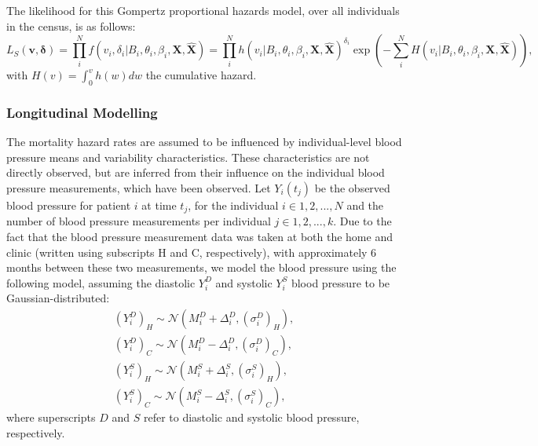 \documentclass[
]{article}
\begin{document}
The likelihood for this Gompertz proportional hazards model, over all individuals in the census, is as follows:
\begin{equation}\label{likesurv}
L_S(\boldsymbol{v},\boldsymbol{\delta})=\prod_i^N f(v_i,\delta_i|B_i,\theta_i,\beta_i,\boldsymbol{X},\hat{\boldsymbol{X}})=\prod_i^N h(v_i|B_i,\theta_i,\beta_i,\boldsymbol{X},\hat{\boldsymbol{X}})^{\delta_i} \exp{\left( -\sum_i^N H(v_i|B_i,\theta_i,\beta_i,\boldsymbol{X},\hat{\boldsymbol{X}}) \right)},
\end{equation}
with \(H(v)=\int_0^v h(w)dw\) the cumulative hazard.

\hypertarget{longitudinal-modelling}{%
\subsubsection{Longitudinal Modelling}\label{longitudinal-modelling}}

The mortality hazard rates are assumed to be influenced by individual-level blood pressure means and variability characteristics.
These characteristics are not directly observed, but are inferred from their influence on the individual blood pressure measurements, which have been observed.
Let \(Y_i(t_j)\) be the observed blood pressure for patient \(i\) at time \(t_j\), for the individual \(i\in 1,2,...,N\) and the number of blood pressure measurements per individual \(j\in 1,2,...,k\). Due to the fact that the blood pressure measurement data was taken at both the home and clinic (written using subscripts H and C, respectively), with approximately 6 months between these two measurements, we model the blood pressure using the following model, assuming the diastolic \(Y_{i}^D\) and systolic \(Y_{i}^S\) blood pressure to be Gaussian-distributed:
\begin{equation}\label{bp}
\begin{aligned}
  (Y_{i}^D)_{H} \sim \mathcal{N}(M_i^D+\Delta_i^D,(\sigma_i^D)_H),\\
  (Y_{i}^D)_{C} \sim \mathcal{N}(M_i^D-\Delta_i^D,(\sigma_i^D)_C),\\
  (Y_{i}^S)_{H} \sim \mathcal{N}(M_i^S+\Delta_i^S,(\sigma_i^S)_H),\\
  (Y_{i}^S)_{C} \sim \mathcal{N}(M_i^S-\Delta_i^S,(\sigma_i^S)_C),
\end{aligned}
\end{equation}
where superscripts \(D\) and \(S\) refer to diastolic and systolic blood pressure, respectively.
\end{document}
